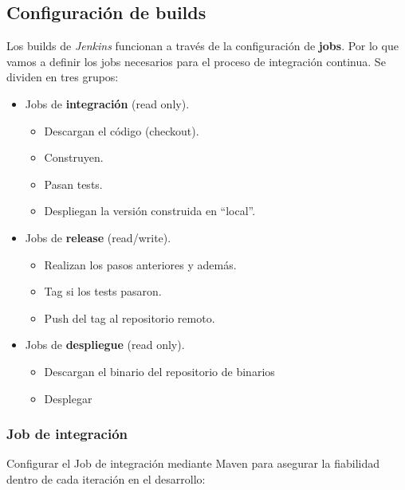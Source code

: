 \subsection{Configuración de builds}
\label{sub:jenkins-build-jobs}

\par Los builds de \emph{Jenkins} funcionan a través de la configuración de \textbf{jobs}. Por lo que vamos a definir los jobs necesarios para el proceso de integración continua. Se dividen en tres grupos:

\begin{itemize}
    \item Jobs de \textbf{integración} (read only).
        \begin{itemize}
            \item Descargan el código (checkout).
            \item Construyen.
            \item Pasan tests.
            \item Despliegan la versión construida en ``local''.
        \end{itemize}
    \item Jobs de \textbf{release} (read/write).
        \begin{itemize}
            \item Realizan los pasos anteriores y además.
            \item Tag si los tests pasaron.
            \item Push del tag al repositorio remoto.
        \end{itemize}
    \item Jobs de \textbf{despliegue} (read only).
        \begin{itemize}
            \item Descargan el binario del repositorio de binarios
            \item Desplegar
        \end{itemize}
\end{itemize}

\subsubsection{Job de integración}
\label{subs:jenkins-job-integracion}

\par Configurar el Job de integración mediante Maven para asegurar la fiabilidad dentro de cada iteración en el desarrollo:

